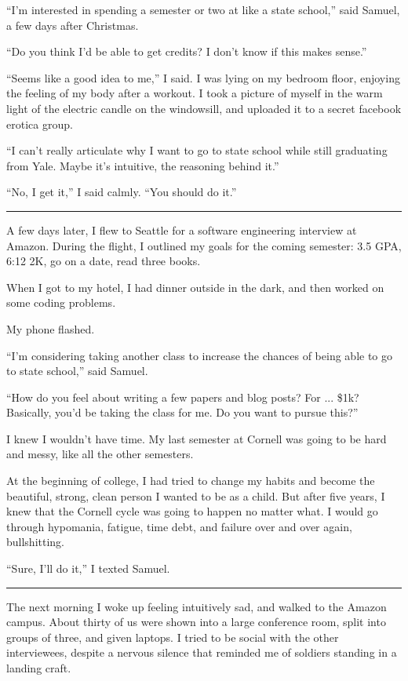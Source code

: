 ``I'm interested in spending a semester or two at like a state school,'' said
Samuel, a few days after Christmas.  

``Do you think I'd be able to get credits?  I don't know if this makes sense.''

``Seems like a good idea to me,'' I said.  I was lying on my bedroom floor,
enjoying the feeling of my body after a workout.  I took a picture of myself in
the warm light of the electric candle on the windowsill, and uploaded it to a
secret facebook erotica group. 

``I can't really articulate why I want to go to state school while still
graduating from Yale.  Maybe it's intuitive, the reasoning behind it.'' 

``No, I get it,'' I said calmly. ``You should do it.''

\plainfancybreak{12pt}{2}{}

A few days later, I flew to Seattle for a software engineering interview at
Amazon.  During the flight, I outlined my goals for the coming semester: 3.5 GPA,
6:12 2K, go on a date, read three books.  


When I got to my hotel, I had dinner outside in the dark, and then worked on
some coding problems.

My phone flashed.

``I'm considering taking another class to increase the chances of being able to
go to state school,'' said Samuel.  

``How do you feel about writing a few papers and blog posts?  For ... \$1k?
Basically, you'd be taking the class for me.  Do you want to pursue this?'' 

I knew I wouldn't have time.  My last semester at Cornell was going to be hard
and messy, like all the other semesters.


At the beginning of college, I had tried to change my habits and become the
beautiful, strong, clean person I wanted to be as a child.  But after five
years, I knew that the Cornell cycle was going to happen no matter what.  I
would go through hypomania, fatigue, time debt, and failure over and over again,
bullshitting.

``Sure, I'll do it,'' I texted Samuel.

\plainfancybreak{12pt}{2}{}

The next morning I woke up feeling intuitively sad, and walked to the Amazon
campus.  About thirty of us were shown into a large conference room, split into
groups of three, and given laptops.  I tried to be social with the other
interviewees, despite a nervous silence that reminded me of soldiers standing in
a landing craft. 

